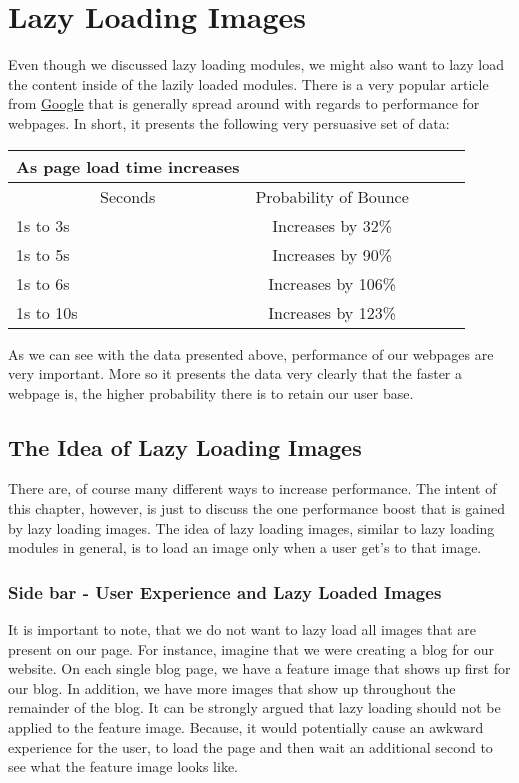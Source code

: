 \chapter{ Lazy Loading Images }

Even though we discussed lazy loading modules, we might also want to lazy load 
the content inside of the lazily loaded modules. There is a very popular 
article from \href{https://www.thinkwithgoogle.com/marketing-resources/data-measurement/mobile-page-speed-new-industry-benchmarks/}{Google} 
that is generally spread around with regards to performance for webpages. 
In short, it presents the following very persuasive set of data: 

\begin{center}
  \begin{tabular}{@{} l *4c @{}}
    \toprule
    \multicolumn{1}{c}{\color{red}As page load time increases}\\
    \toprule
    \multicolumn{1}{c}{\color{red}Seconds} & Probability of Bounce \\
    \midrule
    1s to 3s       & Increases by 32\% \\
    1s to 5s       & Increases by 90\% \\
    1s to 6s       & Increases by 106\% \\
    1s to 10s       & Increases by 123\% \\
  \end{tabular}
\end{center}  

As we can see with the data presented above, performance of our webpages are 
very important. More so it presents the data very clearly that the faster 
a webpage is, the higher probability there is to retain our user base. 

\section{The Idea of Lazy Loading Images}
There are, of course many different ways to increase performance. The intent 
of this chapter, however, is just to discuss the one performance boost that 
is gained by lazy loading images. The idea of lazy loading images, similar 
to lazy loading modules in general, is to load an image only when a user 
get's to that image. 

\subsection{Side bar - User Experience and Lazy Loaded Images}
It is important to note, that we do not want to lazy load all images
that are present on our page. For instance, imagine that we were creating a 
blog for our website. On each single blog page, we have a feature image 
that shows up first for our blog. In addition, we have more images that 
show up throughout the remainder of the blog. It can be strongly argued 
that lazy loading should not be applied to the feature image. Because, it 
would potentially cause an awkward experience for the user, to load the page 
and then wait an additional second to see what the feature image looks like. 

